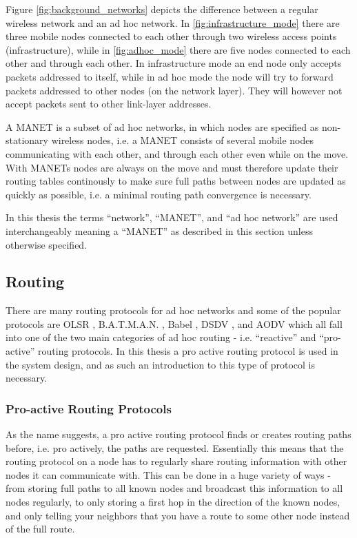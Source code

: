 Figure \ref{fig:background_networks} depicts the difference between a regular
wireless network and an ad hoc network. In \ref{fig:infrastructure_mode} there
are three mobile nodes connected to each other through two wireless access points
(infrastructure), while in \ref{fig:adhoc_mode} there are five nodes connected
to each other and through each other. In infrastructure mode an end node only
accepts packets addressed to itself, while in ad hoc mode the node will try to
forward packets addressed to other nodes (on the network layer). They will
however not accept packets sent to other link-layer addresses.

A \ac{MANET} is a subset of ad hoc networks, in which nodes are specified as
non-stationary wireless nodes, i.e. a \ac{MANET} consists of several mobile
nodes communicating with each other, and through each other even while on the
move. With \acp{MANET} nodes are always on the move and must therefore update
their routing tables continously to make sure full paths between nodes are
updated as quickly as possible, i.e. a minimal routing path convergence is
necessary.

In this thesis the terms ``network'', ``\ac{MANET}'', and ``ad hoc network''
are used interchangeably meaning a ``\ac{MANET}'' as described in this section
unless otherwise specified.

\subsection{Routing}
There are many routing protocols for ad hoc networks and some of the popular
protocols are OLSR \cite{olsr_paper}, B.A.T.M.A.N. \cite{batman_rfc}, Babel
\cite{rfc6126}, DSDV \cite{he2002destination}, and AODV
\cite{Perkins:2003:AHO:RFC3561} which all fall into one of the two main
categories of ad hoc routing - i.e. ``reactive'' and ``pro-active'' routing
protocols. In this thesis a pro active routing protocol is used in the system
design, and as such an introduction to this type of protocol is necessary.

\subsubsection*{Pro-active Routing Protocols}
As the name suggests, a pro active routing protocol finds or creates routing
paths before, i.e. pro actively, the paths are requested. Essentially this means
that the routing protocol on a node has to regularly share routing information
with other nodes it can communicate with. This can be done in a huge variety of
ways - from storing full paths to all known nodes and broadcast this information
to all nodes regularly, to only storing a first hop in the direction of the
known nodes, and only telling your neighbors that you have a route to some other
node instead of the full route.


